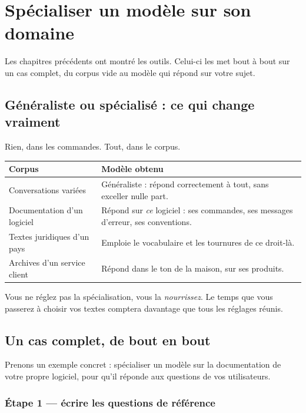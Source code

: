 \chapter{Spécialiser un modèle sur son domaine}

Les chapitres précédents ont montré les outils. Celui-ci les met bout à bout sur
un cas complet, du corpus vide au modèle qui répond sur votre sujet.

\section{Généraliste ou spécialisé : ce qui change vraiment}

Rien, dans les commandes. Tout, dans le corpus.

\begin{center}
\begin{tabular}{p{4.0cm}p{9.6cm}}
\toprule
\textbf{Corpus} & \textbf{Modèle obtenu} \\
\midrule
Conversations variées & Généraliste : répond correctement à tout, sans exceller
                        nulle part. \\
Documentation d'un logiciel & Répond sur \emph{ce} logiciel : ses commandes, ses
                        messages d'erreur, ses conventions. \\
Textes juridiques d'un pays & Emploie le vocabulaire et les tournures de ce
                        droit-là. \\
Archives d'un service client & Répond dans le ton de la maison, sur ses
                        produits. \\
\bottomrule
\end{tabular}
\end{center}

\begin{nkretenir}
Vous ne réglez pas la spécialisation, vous la \emph{nourrissez}. Le temps que
vous passerez à choisir vos textes comptera davantage que tous les réglages
réunis.
\end{nkretenir}

\section{Un cas complet, de bout en bout}

Prenons un exemple concret : spécialiser un modèle sur la documentation de votre
propre logiciel, pour qu'il réponde aux questions de vos utilisateurs.

\subsection{Étape 1 — écrire les questions de référence}

